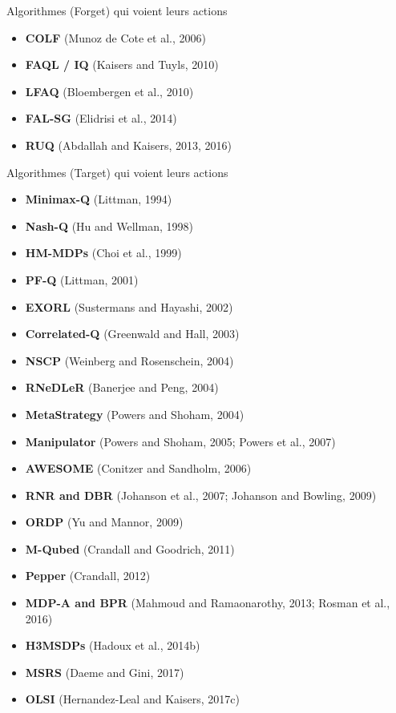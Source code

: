 \documentclass[aspectratio=169,xcolor=dvipsnames]{beamer}
\begin{document}
\begin{frame}{Algorithmes (Forget) qui voient leurs actions}
\begin{itemize}
    \item \textbf{COLF} (Munoz de Cote et al., 2006)
    \item \textbf{FAQL / IQ} (Kaisers and Tuyls, 2010)
    \item \textbf{LFAQ} (Bloembergen et al., 2010)
    \item \textbf{FAL-SG} (Elidrisi et al., 2014)
    \item \textbf{RUQ} (Abdallah and Kaisers, 2013, 2016)
\end{itemize}
\end{frame}


\begin{frame}{Algorithmes (Target) qui voient leurs actions}
\scriptsize
\begin{itemize}
    \item \textbf{Minimax-Q} (Littman, 1994)
    \item \textbf{Nash-Q} (Hu and Wellman, 1998)
    \item \textbf{HM-MDPs} (Choi et al., 1999)
    \item \textbf{PF-Q} (Littman, 2001)
    \item \textbf{EXORL} (Sustermans and Hayashi, 2002)
    \item \textbf{Correlated-Q} (Greenwald and Hall, 2003)
    \item \textbf{NSCP} (Weinberg and Rosenschein, 2004)
    \item \textbf{RNeDLeR} (Banerjee and Peng, 2004)
    \item \textbf{MetaStrategy} (Powers and Shoham, 2004)
    \item \textbf{Manipulator} (Powers and Shoham, 2005; Powers et al., 2007)
    \item \textbf{AWESOME} (Conitzer and Sandholm, 2006)
    \item \textbf{RNR and DBR} (Johanson et al., 2007; Johanson and Bowling, 2009)
    \item \textbf{ORDP} (Yu and Mannor, 2009)
    \item \textbf{M-Qubed} (Crandall and Goodrich, 2011)
    \item \textbf{Pepper} (Crandall, 2012)
    \item \textbf{MDP-A and BPR} (Mahmoud and Ramaonarothy, 2013; Rosman et al., 2016)
    \item \textbf{H3MSDPs} (Hadoux et al., 2014b)
    \item \textbf{MSRS} (Daeme and Gini, 2017)
    \item \textbf{OLSI} (Hernandez-Leal and Kaisers, 2017c)
\end{itemize}
\end{frame}
\end{document}
